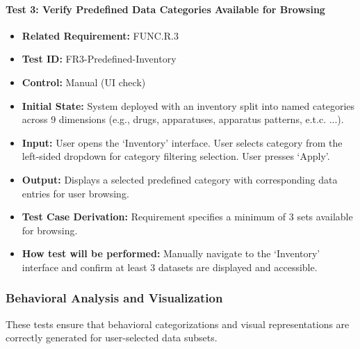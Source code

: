\documentclass[12pt, titlepage]{article}
\begin{document}
\paragraph{Test 3: Verify Predefined Data Categories Available for Browsing}
\begin{itemize}
    \item \textbf{Related Requirement:} FUNC.R.3
    \item \textbf{Test ID:} FR3-Predefined-Inventory
    \item \textbf{Control:} Manual (UI check)
    \item \textbf{Initial State:} System deployed with an inventory split into named categories across 9 dimensions (e.g., drugs, apparatuses, apparatus patterns, e.t.c. ...).
    \item \textbf{Input:} User opens the `Inventory' interface. User selects category from the left-sided dropdown for category filtering selection. User presses `Apply'.
    \item \textbf{Output:} Displays a selected predefined category with corresponding data entries for user browsing.
    \item \textbf{Test Case Derivation:} Requirement specifies a minimum of 3 sets available for browsing.
    \item \textbf{How test will be performed:} Manually navigate to the `Inventory' interface and confirm at least 3 datasets are displayed and accessible.
\end{itemize}

\subsubsection{Behavioral Analysis and Visualization}

These tests ensure that behavioral categorizations and visual representations are correctly generated for user-selected data subsets.
\end{document}
